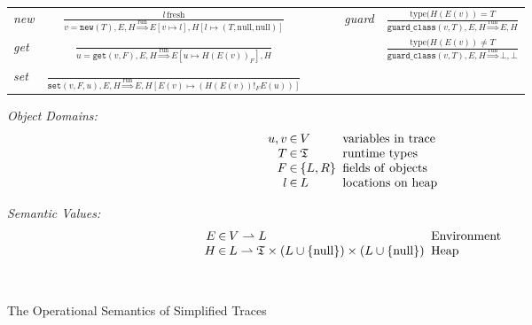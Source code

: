 \documentclass[preprint]{sigplanconf}
\begin{document}
\begin{figure}
\begin{center}
\begin{tabular}{lcccc}
\emph{new} & ${\displaystyle \frac{l\,\mathrm{fresh}}{v=\mathtt{new}(T),E,H\overset{\mathrm{run}}{\Longrightarrow}E\left[v\mapsto l\right],H\left[l\mapsto\left(T,\mathrm{null},\mathrm{null}\right)\right]}}$ & ~~~ & \emph{guard} & ${\displaystyle \frac{\mathrm{type}(H(E(v))=T}{\mathtt{guard\_class}(v,T),E,H\overset{\mathrm{run}}{\Longrightarrow}E,H}}$\tabularnewline[3em]
\emph{get} & ${\displaystyle \frac{\,}{u=\mathtt{get}(v,F),E,H\overset{\mathrm{run}}{\Longrightarrow}E\left[u\mapsto H\left(E\left(v\right)\right)_{F}\right],H}}$ & ~~~ &  & ${\displaystyle \frac{\mathrm{type}(H(E(v))\neq T}{\mathtt{guard\_class}(v,T),E,H\overset{\mathrm{run}}{\Longrightarrow}\bot,\bot}}$\tabularnewline[3em]
\emph{set} & ${\displaystyle \frac{\,}{\mathtt{set}\left(v,F,u\right),E,H\overset{\mathrm{run}}{\Longrightarrow}E,H\left[E\left(v\right)\mapsto\left(H\left(E\left(v\right)\right)!_{F}E(u)\right)\right]}}$ & ~~~ &  & \tabularnewline[4em]
\end{tabular}
\end{center}

\begin{minipage}[b]{7 cm}
\emph{Object Domains:}
$$\setlength\arraycolsep{0.1em}
 \begin{array}{rcll}
    u,v & \in & V & \mathrm{\ variables\ in\ trace}\\
    T & \in & \mathfrak{T} & \mathrm{\ runtime\ types}\\
    F & \in & \left\{ L,R\right\} & \mathrm{\ fields\ of\ objects}\\
    l & \in & L & \mathrm{\ locations\ on\ heap}
 \end{array}
$$
\end{minipage}
\begin{minipage}[b]{5 cm}
\emph{Semantic Values:}
$$\setlength\arraycolsep{0.1em}
 \begin{array}{rcll}
    E & \in & V\rightharpoonup L & \mathrm{\ Environment}\\
    H & \in & L\rightharpoonup\mathfrak{T}\times(L\cup \{ \mathrm{null} \})\times (L\cup \{ \mathrm{null}\} ) & \mathrm{\ Heap}\\
    \\
    \\
 \end{array}
$$
\end{minipage}
\caption{The Operational Semantics of Simplified Traces}
\label{fig:semantics}
\end{figure}
\end{document}
